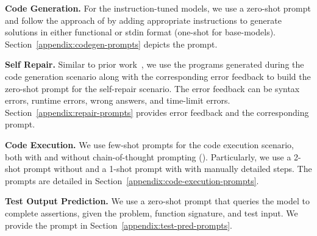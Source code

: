 \noindent \textbf{Code Generation.} 
For the instruction-tuned models, we use a zero-shot prompt and follow the approach of \cite{hendrycks2021measuring} by adding appropriate instructions to generate solutions in either functional or stdin format (one-shot for base-models).
Section~\ref{appendix:codegen-prompts} depicts the prompt.

\noindent \textbf{Self Repair.} 
Similar to prior work~\cite{olausson2023demystifying}, we use the programs generated during the code generation scenario 
along with the corresponding error feedback to build the zero-shot prompt for the self-repair scenario.
The error feedback can be syntax errors, runtime errors, wrong answers, and time-limit errors.
Section~\ref{appendix:repair-prompts} provides error feedback and the corresponding prompt.

\noindent \textbf{Code Execution.} 
We use few-shot prompts for the code execution scenario, both with and without chain-of-thought prompting (\chainot{}). 
Particularly, we use a 2-shot prompt without \chainot{} and a 1-shot prompt with \chainot{} with manually detailed steps.
The prompts are detailed in Section~\ref{appendix:code-execution-prompts}.

\noindent \textbf{Test Output Prediction.} 
We use a zero-shot prompt that queries the model to complete assertions, given the problem, function signature, and test input. 
We provide the prompt in Section~\ref{appendix:test-pred-prompts}.

